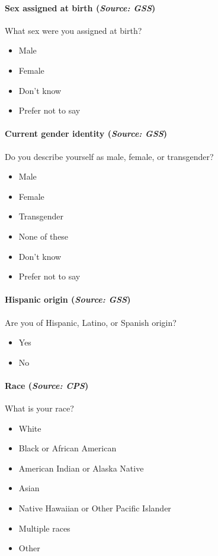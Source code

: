 \documentclass[letterpaper,12pt]{article}
\theoremstyle{proposition}
\begin{document}
\paragraph{Sex assigned at birth (\textit{Source: GSS})}
What sex were you assigned at birth?
\begin{itemize}[itemsep=-10pt,topsep=0pt]
\item Male
\item Female
\item Don’t know
\item Prefer not to say
\end{itemize}

\paragraph{Current gender identity (\textit{Source: GSS})}
Do you describe yourself as male, female, or transgender?
\begin{itemize}[itemsep=-10pt,topsep=0pt]
\item Male
\item Female
\item Transgender
\item None of these
\item Don’t know
\item Prefer not to say
\end{itemize}

\paragraph{Hispanic origin (\textit{Source: GSS})}
Are you of Hispanic, Latino, or Spanish origin?
\begin{itemize}[itemsep=-10pt,topsep=0pt]
\item Yes
\item No
\end{itemize}

\paragraph{Race (\textit{Source: CPS})}
What is your race?
\begin{itemize}[itemsep=-10pt,topsep=0pt]
\item White
\item Black or African American
\item American Indian or Alaska Native
\item Asian
\item Native Hawaiian or Other Pacific Islander
\item Multiple races
\item Other
\end{itemize}
\end{document}
